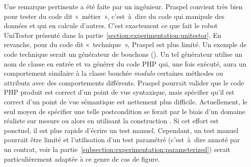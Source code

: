 Une remarque pertinente a été faite par un ingénieur. Praspel convient très bien
pour tester du code dit «~métier~», c'est~à~dire du code qui manipule des
données et qui en calcule d'autres. C'est exactement ce que fait le robot
UniTestor présenté dans la partie~\ref{section:experimentation:unitestor}. En
revanche, pour du code dit «~technique~», Praspel est plus limité. Un exemple de
code technique serait un générateur de bouchons (). Un
tel générateur utilise un nom de classe en entrée et va générer du code PHP qui,
une fois exécuté, aura un comportement similaire à la classe bouchée {\em
modulo} certaines méthodes ou attributs avec des comportements différents.
Praspel pourrait valider que le code PHP produit est correct d'un point de vue
syntaxique, mais spécifier qu'il est correct d'un point de vue sémantique est
nettement plus difficile. Actuellement, le seul moyen de spécifier une telle
postcondition se ferait par le biais d'un domaine réaliste sur mesure ou alors
en utilisant la construction \apred{\empty}. Si cet effort est ponctuel, il est
plus rapide d'écrire un test manuel. Cependant, un test manuel pourrait être
limité et l'utilisation d'un test paramétré (c'est~à~dire annoté par un contrat,
voir la partie~\ref{subsection:experimentation:parameterized}) serait
particulièrement adaptée à ce genre de cas de figure.
